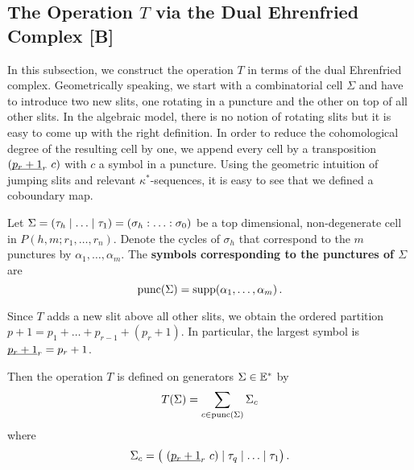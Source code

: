 \subsection{The Operation \texorpdfstring{$T$}{T} via the Dual Ehrenfried Complex [B]}
In this subsection, we construct the operation $T$ in terms of the dual Ehrenfried complex.
Geometrically speaking, we start with a combinatorial cell $\Sigma$ and have to introduce two new slits,
one rotating in a puncture and the other on top of all other slits.
In the algebraic model, there is no notion of rotating slits but it is easy to come up with the right definition.
In order to reduce the cohomological degree of the resulting cell by one, we append every cell by a transposition $(\underline{\smash{p_r+1}}_r\ c)$ with $c$ a symbol in a puncture.
Using the geometric intuition of jumping slits and relevant $\kappa^\ast$-sequences, it is easy to see that we defined a coboundary map.

\begin{defi}
    \label{homology_operations:parallel_T:symbols_of_a_puncture}
    Let $\Sigma = \inhom = \homog$ be a top dimensional, non-degenerate cell in $P(h,m; r_1, \ldots, r_n)$.
    Denote the cycles of $\sigma_h$ that correspond to the $m$ punctures by $\alpha_1, \ldots, \alpha_m$.
    The {\bf symbols corresponding to the punctures of $\Sigma$} are
    \[
        \punc(\Sigma) = \supp(\alpha_1, \ldots, \alpha_m) \,.
    \]
\end{defi}
\begin{notation}
    Since $T$ adds a new slit above all other slits, we obtain the ordered partition $p+1 = p_1 + \ldots + p_{r-1} + (p_r+1)$.
    In particular, the largest symbol is $\underline{\smash{p_r+1}}_r = p_r+1$.
\end{notation}

\begin{defi}
    \label{homology_operations:parallel_T:defn_on_cells}
    Then the operation $T$ is defined on generators $\Sigma \in \mathbb E^\ast$ by
    \[
        T(\Sigma) = \sum_{c \in \operatorname{punc}(\Sigma)} \Sigma_c 
    \]
    where
    \[
        \Sigma_c = \big(\ (\ul{p_r+1}_r\ c) \mid \tau_q \mid \ldots \mid \tau_1 \big) \,.
    \]
\end{defi}

